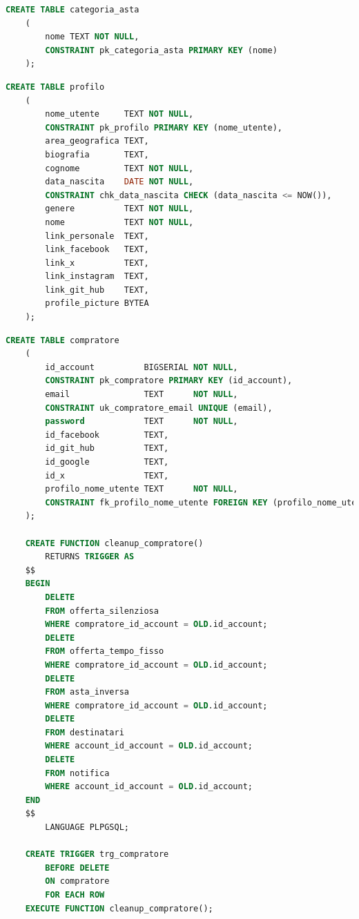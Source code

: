 \begin{lstlisting}[language=SQL, caption=Relazione categoria asta]
    CREATE TABLE categoria_asta
    (
        nome TEXT NOT NULL,
        CONSTRAINT pk_categoria_asta PRIMARY KEY (nome)
    );
\end{lstlisting}

\begin{lstlisting}[language=SQL, caption=Relazione profilo]
    CREATE TABLE profilo
    (
        nome_utente     TEXT NOT NULL,
        CONSTRAINT pk_profilo PRIMARY KEY (nome_utente),
        area_geografica TEXT,
        biografia       TEXT,
        cognome         TEXT NOT NULL,
        data_nascita    DATE NOT NULL,
        CONSTRAINT chk_data_nascita CHECK (data_nascita <= NOW()),
        genere          TEXT NOT NULL,
        nome            TEXT NOT NULL,
        link_personale  TEXT,
        link_facebook   TEXT,
        link_x          TEXT,
        link_instagram  TEXT,
        link_git_hub    TEXT,
        profile_picture BYTEA
    );
\end{lstlisting}

\begin{lstlisting}[language=SQL, caption=Relazione compratore]
    CREATE TABLE compratore
    (
        id_account          BIGSERIAL NOT NULL,
        CONSTRAINT pk_compratore PRIMARY KEY (id_account),
        email               TEXT      NOT NULL,
        CONSTRAINT uk_compratore_email UNIQUE (email),
        password            TEXT      NOT NULL,
        id_facebook         TEXT,
        id_git_hub          TEXT,
        id_google           TEXT,
        id_x                TEXT,
        profilo_nome_utente TEXT      NOT NULL,
        CONSTRAINT fk_profilo_nome_utente FOREIGN KEY (profilo_nome_utente) REFERENCES profilo (nome_utente) ON UPDATE CASCADE ON DELETE CASCADE
    );
    
    CREATE FUNCTION cleanup_compratore()
        RETURNS TRIGGER AS
    $$
    BEGIN
        DELETE
        FROM offerta_silenziosa
        WHERE compratore_id_account = OLD.id_account;
        DELETE
        FROM offerta_tempo_fisso
        WHERE compratore_id_account = OLD.id_account;
        DELETE
        FROM asta_inversa
        WHERE compratore_id_account = OLD.id_account;
        DELETE
        FROM destinatari
        WHERE account_id_account = OLD.id_account;
        DELETE
        FROM notifica
        WHERE account_id_account = OLD.id_account;
    END
    $$
        LANGUAGE PLPGSQL;
    
    CREATE TRIGGER trg_compratore
        BEFORE DELETE
        ON compratore
        FOR EACH ROW
    EXECUTE FUNCTION cleanup_compratore();
\end{lstlisting}

